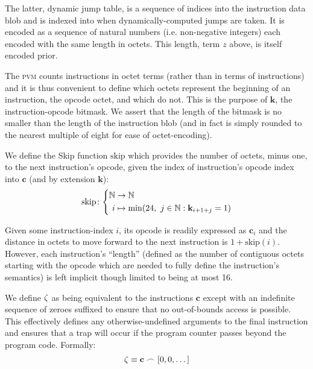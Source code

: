 The latter, dynamic jump table, is a sequence of indices into the instruction data blob and is indexed into when dynamically-computed jumps are taken. It is encoded as a sequence of natural numbers (i.e. non-negative integers) each encoded with the same length in octets. This length, term $z$ above, is itself encoded prior.

The \textsc{pvm} counts instructions in octet terms (rather than in terms of instructions) and it is thus convenient to define which octets represent the beginning of an instruction, \ie the opcode octet, and which do not. This is the purpose of $\mathbf{k}$, the instruction-opcode bitmask. We assert that the length of the bitmask is no smaller than the length of the instruction blob (and in fact is simply rounded to the nearest multiple of eight for ease of octet-encoding).

\newcommand{\Fskip}{\text{skip}}

We define the Skip function $\Fskip$ which provides the number of octets, minus one, to the next instruction's opcode, given the index of instruction's opcode index into $\mathbf{c}$ (and by extension  $\mathbf{k}$):
\begin{equation}
  \Fskip\colon\left\{\begin{aligned}
    \N &\to \N\\
    i &\mapsto \min(24,\ j \in \N : \mathbf{k}_{i + 1 + j} = 1)
  \end{aligned}\right.
\end{equation}

Given some instruction-index $i$, its opcode is readily expressed as $\mathbf{c}_i$ and the distance in octets to move forward to the next instruction is $1 + \Fskip(i)$. However, each instruction's ``length'' (defined as the number of contiguous octets starting with the opcode which are needed to fully define the instruction's semantics) is left implicit though limited to being at most 16.

We define $\zeta$ as being equivalent to the instructions $\mathbf{c}$ except with an indefinite sequence of zeroes suffixed to ensure that no out-of-bounds access is possible. This effectively defines any otherwise-undefined arguments to the final instruction and ensures that a trap will occur if the program counter passes beyond the program code. Formally:
\begin{equation}\label{eq:instructions}
  \instructions \equiv \mathbf{c} \concat \sq{0, 0, \dots}
\end{equation}


